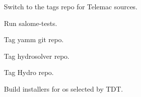 \begin{todolist}
\setlength\itemsep{0.01em}
  \item Switch to the tags repo for Telemac sources.
  \item Run salome-tests.
  \item Tag yamm git repo.
  \item Tag hydrosolver repo.
  \item Tag Hydro repo.
  \item Build installers for os selected by TDT\@.
\end{todolist}
